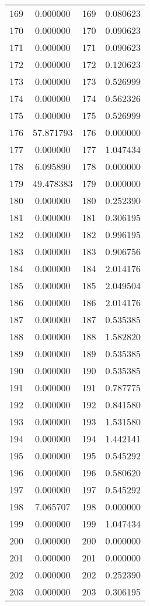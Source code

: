 \documentclass[12pt]{article}
\begin{document}
\begin{longtable}{@{}cccc@{}}
169 & 0.000000 & 169 & 0.080623 \\
170 & 0.000000 & 170 & 0.090623 \\
171 & 0.000000 & 171 & 0.090623 \\
172 & 0.000000 & 172 & 0.120623 \\
173 & 0.000000 & 173 & 0.526999 \\
174 & 0.000000 & 174 & 0.562326 \\
175 & 0.000000 & 175 & 0.526999 \\
176 & 57.871793 & 176 & 0.000000 \\
177 & 0.000000 & 177 & 1.047434 \\
178 & 6.095890 & 178 & 0.000000 \\
179 & 49.478383 & 179 & 0.000000 \\
180 & 0.000000 & 180 & 0.252390 \\
181 & 0.000000 & 181 & 0.306195 \\
182 & 0.000000 & 182 & 0.996195 \\
183 & 0.000000 & 183 & 0.906756 \\
184 & 0.000000 & 184 & 2.014176 \\
185 & 0.000000 & 185 & 2.049504 \\
186 & 0.000000 & 186 & 2.014176 \\
187 & 0.000000 & 187 & 0.535385 \\
188 & 0.000000 & 188 & 1.582820 \\
189 & 0.000000 & 189 & 0.535385 \\
190 & 0.000000 & 190 & 0.535385 \\
191 & 0.000000 & 191 & 0.787775 \\
192 & 0.000000 & 192 & 0.841580 \\
193 & 0.000000 & 193 & 1.531580 \\
194 & 0.000000 & 194 & 1.442141 \\
195 & 0.000000 & 195 & 0.545292 \\
196 & 0.000000 & 196 & 0.580620 \\
197 & 0.000000 & 197 & 0.545292 \\
198 & 7.065707 & 198 & 0.000000 \\
199 & 0.000000 & 199 & 1.047434 \\
200 & 0.000000 & 200 & 0.000000 \\
201 & 0.000000 & 201 & 0.000000 \\
202 & 0.000000 & 202 & 0.252390 \\
203 & 0.000000 & 203 & 0.306195 \\

\end{longtable}
\end{document}

